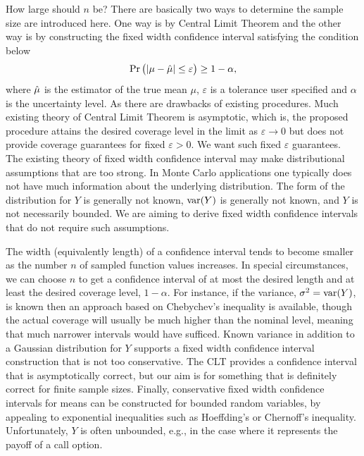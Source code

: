 \documentclass{iitthesis}
\begin{document}
How large should $n$ be? There are basically two ways to determine the sample size are introduced here. One way is by Central Limit Theorem and the other way is by constructing the fixed width confidence interval satisfying the condition below
\begin{align}
\Pr \left(\left \lvert \mu-\hat{\mu} \right \rvert \leq \varepsilon \right) \geq 1-\alpha,
\end{align}
where $\hat{\mu}$ is the estimator of the true mean $\mu$, $\varepsilon$ is a tolerance user specified and $\alpha$ is the uncertainty level.
As there are drawbacks of existing procedures.  Much existing theory of Central Limit Theorem is asymptotic, which is, the proposed procedure attains the desired coverage level in the limit as $\varepsilon\to 0$ but does not provide coverage guarantees for fixed $\varepsilon>0$.  We want such fixed $\varepsilon$ guarantees.  The existing theory of fixed width confidence interval may make distributional assumptions that are too strong.  In Monte Carlo applications one typically does not have much information about the underlying distribution. The form of the distribution for $Y$ is generally not known, $\operatorname{var}(Y)$ is generally not known, and $Y$ is not necessarily bounded. We are aiming to derive fixed width confidence intervals that do not require such assumptions.  

The width (equivalently length) of a confidence interval tends to become smaller as the number $n$ of sampled
function values increases. In special circumstances, we can choose $n$ to get a confidence interval of at most the desired length and at least the desired coverage level, $1-\alpha$. For instance, if the variance, $\sigma^2=\operatorname{var}(Y)$, is known then an approach based on Chebychev's inequality is available, though the actual coverage will usually be much higher than the nominal level, meaning that much narrower intervals would have sufficed. Known variance in addition to a Gaussian distribution for $Y$ supports a fixed width confidence interval construction that is not too conservative. The CLT provides a confidence interval that is asymptotically correct, but our aim is for something that is definitely correct for finite sample sizes. Finally, conservative fixed width confidence intervals for means can be constructed for bounded random variables, by appealing to exponential inequalities such as Hoeffding's or Chernoff's inequality.  Unfortunately, $Y$ is often unbounded, e.g., in the case where it represents the payoff of a call option.
\end{document}
